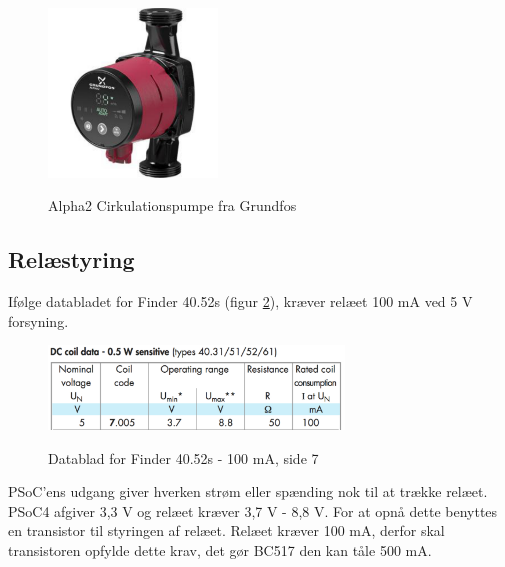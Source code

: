 \begin{figure}[H] \centering
{\includegraphics[width=0.4\textwidth]{filer/design/Billeder/Alpha2}}
\caption{Alpha2 Cirkulationspumpe fra Grundfos}
\label{lab:Alpha2}
\raggedright
\end{figure} 

\subsection{Relæstyring}

Ifølge databladet for Finder 40.52s (figur \ref{lab:finder4052s}), kræver relæet 100 mA ved 5 V forsyning.

\begin{figure}[H] \centering
{\includegraphics[width=0.7\textwidth]{filer/design/Billeder/finder4052s}}
\caption{Datablad for Finder 40.52s - 100 mA, side 7}
\label{lab:finder4052s}
\raggedright
\end{figure} 

PSoC'ens udgang giver hverken strøm eller spænding nok til at trække relæet. PSoC4 afgiver 3,3 V og relæet kræver 3,7 V - 8,8 V. For at opnå dette benyttes en transistor til styringen af relæet. Relæet kræver 100 mA, derfor skal transistoren opfylde dette krav, det gør BC517 den kan tåle 500 mA. \newline

